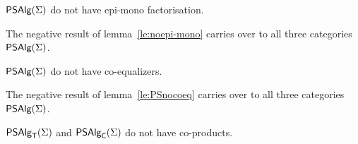\documentclass[10pt]{article}
\begin{document}
\begin{Corollary}
$\mbox{\sf PSAlg}(\Sigma)$ do not have epi-mono factorisation.
\end{Corollary}

\begin{Proof}
The negative result of lemma~\ref{le:noepi-mono} carries over to all
three categories $\mbox{\sf PSAlg}(\Sigma)$.
\end{Proof} 


\begin{Corollary}
$\mbox{\sf PSAlg}(\Sigma)$ do not have co-equalizers.
\end{Corollary}

\begin{Proof}
The negative result of lemma~\ref{le:PSnocoeq} carries over to all
three categories $\mbox{\sf PSAlg}(\Sigma)$.
\end{Proof}

\begin{Fact}
$\mbox{\sf PSAlg}_{\sf T}(\Sigma)$ and $\mbox{\sf PSAlg}_{\sf C}(\Sigma)$ do not have co-products.
\end{Fact}
\end{document}
